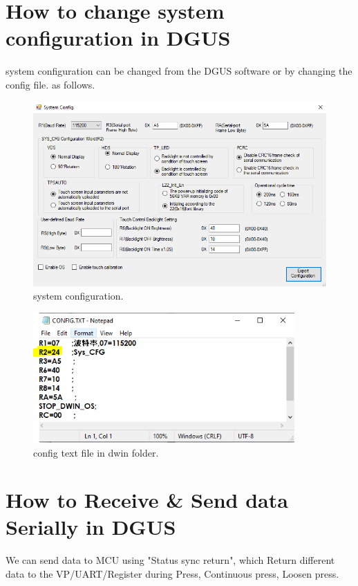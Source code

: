 \documentclass[12pt, A4]{article} %
\begin{document}
\section{How to change system configuration in DGUS}
system configuration can be changed from the DGUS software or by changing the config file. as follows.
\begin{figure}[!htb] %
	\centering
	\includegraphics[width=12cm]{systemConfig} 
	\caption{system configuration.\\}
\end{figure}

\begin{figure}[!htb] %
	\centering
	\includegraphics[width=10cm]{configFile} 
	\caption{config text file in dwin folder.\\}
\end{figure}
\newpage

\section{How to Receive \& Send data Serially in DGUS}

We can send data to MCU using "Status sync return", which Return different data to the VP/UART/Register during Press, Continuous press, Loosen press. 
\end{document}
